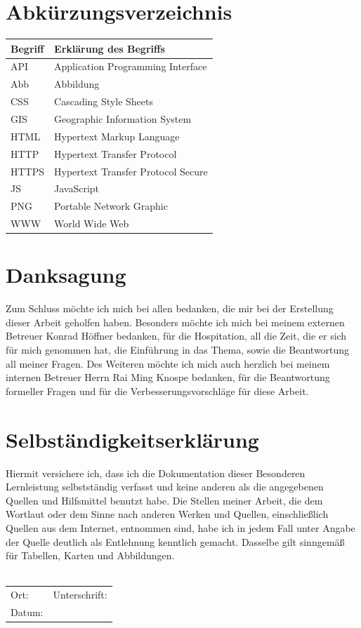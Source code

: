 \documentclass[a4paper, 12pt]{scrreprt}
\begin{document}
\chapter*{Abkürzungsverzeichnis}
\begin{tabularx}{\textwidth}{lX}
\toprule
\textrm{Begriff}                &\textrm{Erklärung des Begriffs}\\
\midrule
API		&Application Programming Interface\\
Abb		&Abbildung\\
CSS		&Cascading Style Sheets\\
GIS		&Geographic Information System \\
HTML	&Hypertext Markup Language\\
HTTP	&Hypertext Transfer Protocol\\
HTTPS	&Hypertext Transfer Protocol Secure\\
JS		&JavaScript\\
PNG		&Portable Network Graphic\\
WWW		&World Wide Web\\

\bottomrule
\end{tabularx}


\listoffigures
{}
\chapter*{Danksagung}
Zum Schluss möchte ich mich bei allen bedanken, die mir bei der Erstellung dieser Arbeit geholfen haben.
Besonders möchte ich mich bei meinem externen Betreuer Konrad Höffner bedanken, für die Hospitation, all die Zeit, die er sich für mich genommen hat, die Einführung in das Thema, sowie die Beantwortung all meiner Fragen.   
Des Weiteren möchte ich mich auch herzlich bei meinem internen Betreuer Herrn Rai Ming Knospe bedanken, für die Beantwortung formeller Fragen und für die Verbesserungsvorschläge für diese Arbeit.
\chapter*{Selbständigkeitserklärung}
Hiermit versichere ich, dass ich die Dokumentation dieser Besonderen Lernleistung selbstständig verfasst und keine anderen als die angegebenen Quellen und Hilfsmittel benutzt habe.
Die Stellen meiner Arbeit, die dem Wortlaut oder dem Sinne nach anderen Werken und Quellen, einschließlich Quellen aus dem Internet, entnommen sind, habe ich in jedem Fall unter Angabe der Quelle deutlich als Entlehnung kenntlich gemacht.
Dasselbe gilt sinngemäß für Tabellen, Karten und Abbildungen.\\\\
\begin{tabularx}{\textwidth}{X X }
Ort: & Unterschrift:\\
Datum:\\
\end{tabularx}
\end{document}
